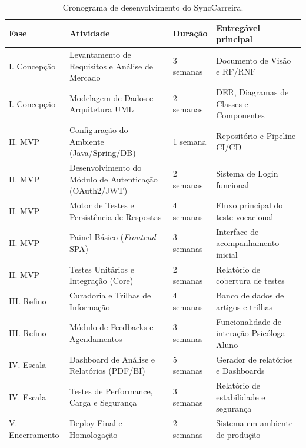 \begin{table}[htb]
\ABNTEXfontereduzida
\caption[Cronograma de Desenvolvimento do SyncCarreira]{Cronograma de desenvolvimento do SyncCarreira.}
\label{tab-cronograma}
\begin{tabular}{p{2.5cm}|p{4.5cm}|p{2cm}|p{5cm}}
\textbf{Fase} & \textbf{Atividade} & \textbf{Duração} & \textbf{Entregável principal} \\
\hline
I. Concepção & Levantamento de Requisitos e Análise de Mercado & 3 semanas & Documento de Visão e RF/RNF \\
\hline
I. Concepção & Modelagem de Dados e Arquitetura UML & 2 semanas & DER, Diagramas de Classes e Componentes \\
\hline
II. MVP & Configuração do Ambiente (Java/Spring/DB) & 1 semana & Repositório e Pipeline CI/CD \\
\hline
II. MVP & Desenvolvimento do Módulo de Autenticação (OAuth2/JWT) & 2 semanas & Sistema de Login funcional \\
\hline
II. MVP & Motor de Testes e Persistência de Respostas & 4 semanas & Fluxo principal do teste vocacional \\
\hline
II. MVP & Painel Básico (\textit{Frontend} SPA) & 3 semanas & Interface de acompanhamento inicial \\
\hline
II. MVP & Testes Unitários e Integração (Core) & 2 semanas & Relatório de cobertura de testes \\
\hline
III. Refino & Curadoria e Trilhas de Informação & 4 semanas & Banco de dados de artigos e trilhas \\
\hline
III. Refino & Módulo de Feedbacks e Agendamentos & 3 semanas & Funcionalidade de interação Psicóloga-Aluno \\
\hline
IV. Escala & Dashboard de Análise e Relatórios (PDF/BI) & 5 semanas & Gerador de relatórios e Dashboards \\
\hline
IV. Escala & Testes de Performance, Carga e Segurança & 3 semanas & Relatório de estabilidade e segurança \\
\hline
V. Encerramento & Deploy Final e Homologação & 2 semanas & Sistema em ambiente de produção \\
\end{tabular}
\end{table}

